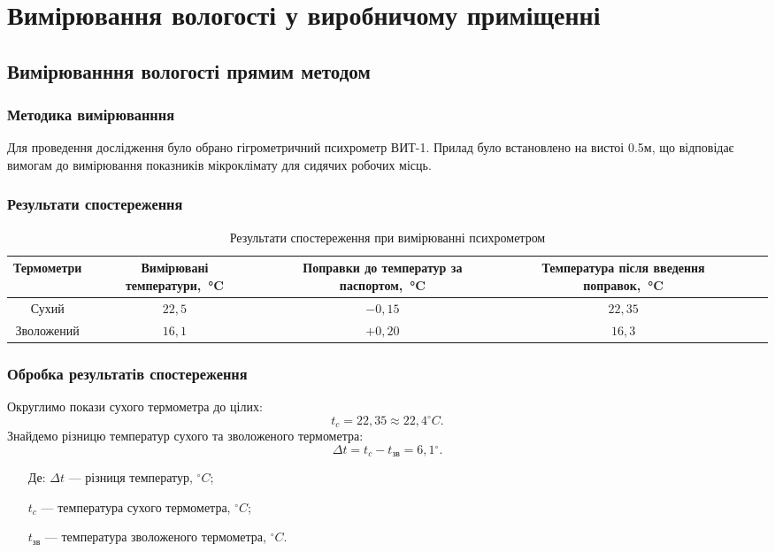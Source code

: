 \chapter{Вимірювання вологості у виробничому приміщенні}

\section{Вимірюванння вологості прямим методом}

\subsection{Методика вимірюванння}

Для проведення дослідження було обрано гігрометричний психрометр ВИТ-1.  Прилад було
встановлено на вистоі 0.5м, що відповідає вимогам до вимірювання показників мікроклімату для сидячих
робочих місць.

\subsection{Результати спостереження}

\begin{table}[ht]
  \centering
  \caption{Результати спостереження при вимірюванні психрометром}
\label{t:results_direct}
\begin{tabular}{| c | c | c | c | c | c |}
\hline
\multicolumn{1}{|C{3cm}|}{Термометри} &
\multicolumn{1}{C{3.5cm}|}{Вимірювані температури,~°C} &
\multicolumn{1}{C{3.5cm}|}{Поправки до температур за паспортом,~°C} &
\multicolumn{1}{C{5cm}|}{Температура після введення поправок,~°C} \\ \hline 
Сухий  & $22,5$ & $-0,15$ & $22,35$ \\ \hline 
Зволожений & $16,1$ & $+0,20$ & $16,3$ \\ \hline 
\end{tabular}
\end{table}

\subsection{Обробка результатів спостереження}

Округлимо покази сухого термометра до цілих: 
\begin{equation}
  t_c = 22,35 \approx 22,4{^\circ}C.
\end{equation}
Знайдемо різницю температур сухого та зволоженого термометра:
\begin{equation}
\Delta t = t_{c}-t_{\text{зв}} = 6,1{^\circ}.
\end{equation}
\begin{itemize}
\item [Де:] $\Delta t$ --- різниця температур, ${^\circ}C$;
\item []$t_{c}$ ---  температура сухого термометра, ${^\circ}C$;
\item []$t_{\text{зв}}$ --- температура зволоженого термометра, ${^\circ}C$.
\end{itemize}

